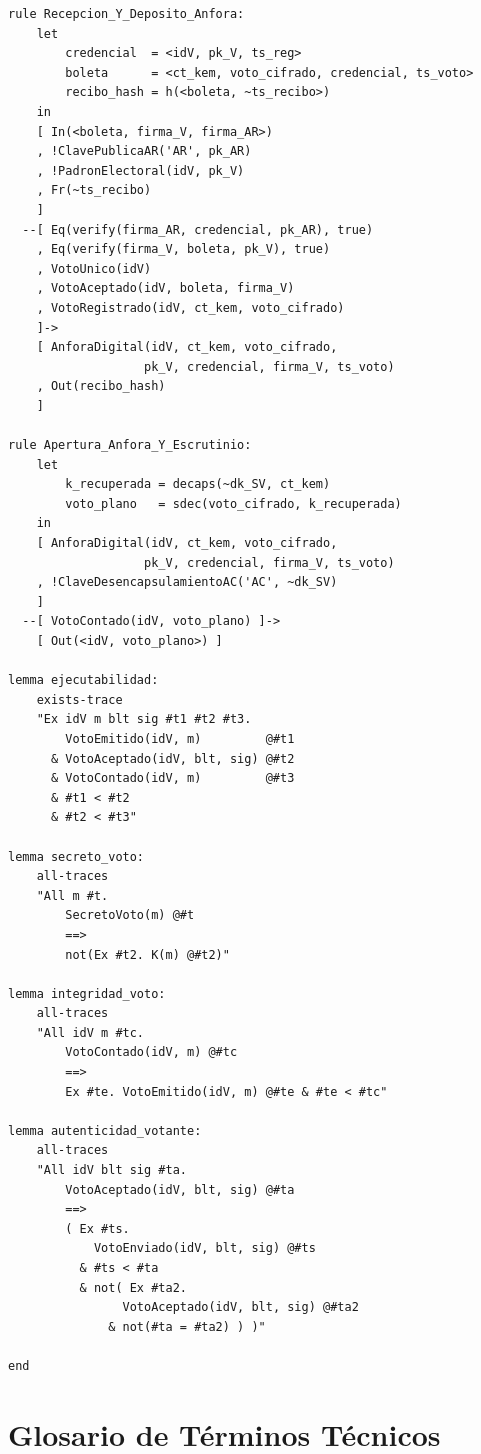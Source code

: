 \documentclass[12pt, a4paper, twoside, openright]{book}
\begin{document}
\begin{lstlisting}[caption={Archivo completo protocolo.spthy},
                   label={lst:full-protocol}]
rule Recepcion_Y_Deposito_Anfora:
    let
        credencial  = <idV, pk_V, ts_reg>
        boleta      = <ct_kem, voto_cifrado, credencial, ts_voto>
        recibo_hash = h(<boleta, ~ts_recibo>)
    in
    [ In(<boleta, firma_V, firma_AR>)
    , !ClavePublicaAR('AR', pk_AR)
    , !PadronElectoral(idV, pk_V)
    , Fr(~ts_recibo)
    ]
  --[ Eq(verify(firma_AR, credencial, pk_AR), true)
    , Eq(verify(firma_V, boleta, pk_V), true)
    , VotoUnico(idV)
    , VotoAceptado(idV, boleta, firma_V)
    , VotoRegistrado(idV, ct_kem, voto_cifrado)
    ]->
    [ AnforaDigital(idV, ct_kem, voto_cifrado,
                   pk_V, credencial, firma_V, ts_voto)
    , Out(recibo_hash)
    ]

rule Apertura_Anfora_Y_Escrutinio:
    let
        k_recuperada = decaps(~dk_SV, ct_kem)
        voto_plano   = sdec(voto_cifrado, k_recuperada)
    in
    [ AnforaDigital(idV, ct_kem, voto_cifrado,
                   pk_V, credencial, firma_V, ts_voto)
    , !ClaveDesencapsulamientoAC('AC', ~dk_SV)
    ]
  --[ VotoContado(idV, voto_plano) ]->
    [ Out(<idV, voto_plano>) ]

lemma ejecutabilidad:
    exists-trace
    "Ex idV m blt sig #t1 #t2 #t3.
        VotoEmitido(idV, m)         @#t1
      & VotoAceptado(idV, blt, sig) @#t2
      & VotoContado(idV, m)         @#t3
      & #t1 < #t2
      & #t2 < #t3"

lemma secreto_voto:
    all-traces
    "All m #t.
        SecretoVoto(m) @#t
        ==>
        not(Ex #t2. K(m) @#t2)"

lemma integridad_voto:
    all-traces
    "All idV m #tc.
        VotoContado(idV, m) @#tc
        ==>
        Ex #te. VotoEmitido(idV, m) @#te & #te < #tc"

lemma autenticidad_votante:
    all-traces
    "All idV blt sig #ta.
        VotoAceptado(idV, blt, sig) @#ta
        ==>
        ( Ex #ts.
            VotoEnviado(idV, blt, sig) @#ts
          & #ts < #ta
          & not( Ex #ta2.
                VotoAceptado(idV, blt, sig) @#ta2
              & not(#ta = #ta2) ) )"

end
\end{lstlisting}

\chapter{Glosario de T\'erminos T\'ecnicos}
\end{document}
